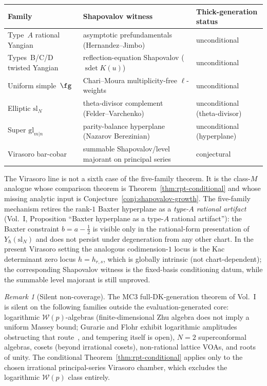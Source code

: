 \documentclass[11pt]{amsart}
\theoremstyle{definition}
\theoremstyle{remark}
\newtheorem{remark}[theorem]{Remark}
\begin{document}
\begin{center}
\renewcommand{\arraystretch}{1.3}
\begin{tabular}{lll}
\textbf{Family} & \textbf{Shapovalov witness} & \textbf{Thick-generation status} \\
\hline
Type~$A$ rational Yangian & asymptotic prefundamentals (Hernandez--Jimbo) &
unconditional \\
Types~B/C/D twisted Yangian & reflection-equation Shapovalov
($\operatorname{sdet}K(u)$) & unconditional \\
Uniform simple~$\fg$ & Chari--Moura multiplicity-free
$\ell$-weights & unconditional \\
Elliptic $\mathrm{sl}_N$ & theta-divisor complement
(Felder--Varchenko) & unconditional (theta-divisor) \\
Super $\mathrm{gl}_{m|n}$ & parity-balance hyperplane (Nazarov
Berezinian) & unconditional (hyperplane) \\
\hline
Virasoro bar-cobar & summable Shapovalov/level majorant on principal
series & conjectural
\end{tabular}
\end{center}

The Virasoro line is not a sixth case of the five-family theorem.  It
is the class-$M$ analogue whose comparison theorem is
Theorem~\ref{thm:rpt-conditional} and whose missing analytic input is
Conjecture~\ref{conj:shapovalov-growth}.
The five-family mechanism retires the rank-$1$ Baxter hyperplane as a
\emph{type-$A$ rational artifact}
(Vol.~I, Proposition ``Baxter hyperplane as a type-$A$ rational
artifact''): the
Baxter constraint $b = a - \tfrac12$ is visible only in the
rational-form presentation of $Y_\hbar(\mathrm{sl}_N)$ and does not
persist under degeneration from any other chart. In the present
Virasoro setting the analogous codimension-$1$ locus is the Kac
determinant zero locus $h = h_{r,s}$, which is globally intrinsic
(not chart-dependent); the corresponding Shapovalov witness is the
fixed-basis conditioning datum, while the summable level majorant is
still unproved.

\begin{remark}[Silent non-coverage]
\label{rem:silent-non-coverage}
The MC3 full-DK-generation theorem
of Vol.~I is silent on the
following families outside the evaluation-generated core: logarithmic
$\mathcal{W}(p)$-algebras (finite-dimensional Zhu algebra does not
imply a uniform Massey bound; Gurarie and Flohr exhibit logarithmic
amplitudes obstructing that route~\cite{Gurarie93,Flohr96}, and
tempering itself is open), $N = 2$ superconformal algebras, cosets
(beyond irrational cosets), non-rational lattice VOAs, and roots of
unity. The conditional Theorem~\ref{thm:rpt-conditional} applies only
to the chosen irrational principal-series Virasoro chamber, which
excludes the logarithmic $\mathcal{W}(p)$ class entirely.
\end{remark}
\end{document}
